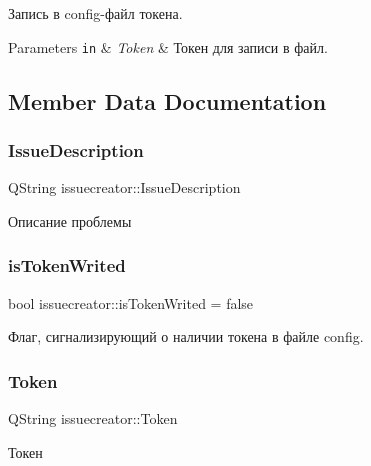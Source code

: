 Запись в config-\/файл токена. 


\begin{DoxyParams}[1]{Parameters}
\mbox{\tt in}  & {\em Token} & Токен для записи в файл. \\
\hline
\end{DoxyParams}


\subsection{Member Data Documentation}
\mbox{\label{classissuecreator_a7d6bc72a5a8ddafa35e3d0e759918586}} 
\subsubsection{Issue\+Description}
{\footnotesize\ttfamily Q\+String issuecreator\+::\+Issue\+Description\hspace{0.3cm}{\ttfamily [private]}}



Описание проблемы 

\mbox{\label{classissuecreator_ab95a97a1a87dae8170bfaf0c95859413}} 
\subsubsection{is\+Token\+Writed}
{\footnotesize\ttfamily bool issuecreator\+::is\+Token\+Writed = false\hspace{0.3cm}{\ttfamily [private]}}



Флаг, сигнализирующий о наличии токена в файле config. 

\mbox{\label{classissuecreator_ad8f87f64c334987f0316a3d3191d55c8}} 
\subsubsection{Token}
{\footnotesize\ttfamily Q\+String issuecreator\+::\+Token\hspace{0.3cm}{\ttfamily [private]}}



Токен 

